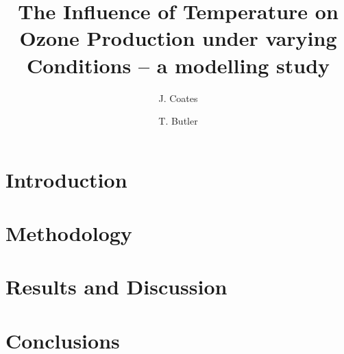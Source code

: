 \documentclass[11pt,a4paper]{article}
\title{The Influence of Temperature on Ozone Production under varying \ce{NO_x} Conditions -- a modelling study}
\author[1]{J. Coates}
\author[1]{T. Butler}
\affil[1]{Institute for Advanced Sustainability Studies, Potsdam, Germany}
\begin{document}
\maketitle

\begin{abstract}
\end{abstract}

\section{Introduction} \label{s:introduction}


\section{Methodology} \label{s:methodology}


\section{Results and Discussion} \label{s:results}


\section{Conclusions} \label{s:conclusions}



 
\end{document}
